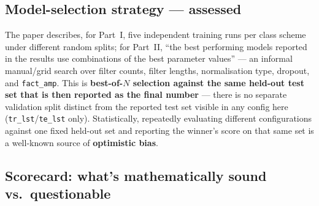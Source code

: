 \documentclass[11pt]{article}
\begin{document}
\subsection{Model-selection strategy --- assessed}
\label{sec:B5}

The paper describes, for Part~I, five independent training runs per class
scheme under different random splits; for Part~II, ``the best performing
models reported in the results use combinations of the best parameter
values'' --- an informal manual/grid search over filter counts, filter
lengths, normalisation type, dropout, and \texttt{fact\_amp}. This is
\textbf{best-of-$N$ selection against the same held-out test set that is
then reported as the final number} --- there is no separate validation
split distinct from the reported test set visible in any config here
(\texttt{tr\_lst}/\texttt{te\_lst} only). Statistically, repeatedly
evaluating different configurations against one fixed held-out set and
reporting the winner's score on that same set is a well-known source of
\textbf{optimistic bias}.

\subsection{Scorecard: what's mathematically sound vs.\ questionable}
\end{document}
